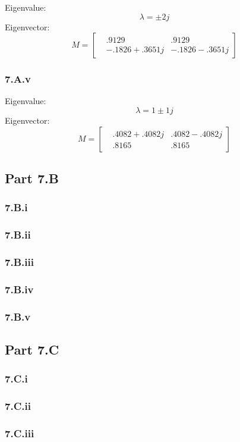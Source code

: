 \documentclass[12px]{article}
\begin{document}
Eigenvalue:
$$ \lambda = \pm2j $$
Eigenvector:
$$M =
\begin{bmatrix}
    & .9129 & .9129 \\
    & -.1826 + .3651j & -.1826 - .3651j
\end{bmatrix}
$$
\subsubsection*{7.A.v}

Eigenvalue:
$$ \lambda = 1\pm1j $$
Eigenvector:
$$M =
\begin{bmatrix}
    & .4082+.4082j & .4082-.4082j \\
    & .8165 & .8165
\end{bmatrix}
$$

\subsection*{Part 7.B}
\subsubsection*{7.B.i}
\subsubsection*{7.B.ii}
\subsubsection*{7.B.iii}
\subsubsection*{7.B.iv}
\subsubsection*{7.B.v}

\subsection*{Part 7.C}
\subsubsection*{7.C.i}
\subsubsection*{7.C.ii}
\subsubsection*{7.C.iii}
\end{document}

